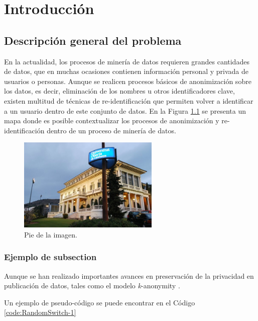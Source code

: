 \chapter{Introducción}
\label{chapter:introduccion}


\section{Descripción general del problema}

En la actualidad, los procesos de minería de datos requieren grandes cantidades de datos, que en muchas ocasiones contienen información personal y privada de usuarios o personas. Aunque se realicen procesos básicos de anonimización sobre los datos, es decir, eliminación de los nombres u otros identificadores clave, existen multitud de técnicas de re-identificación que permiten volver a identificar a un usuario dentro de este conjunto de datos. En la Figura \ref{fig:context-anoni1} se presenta un mapa donde es posible contextualizar los procesos de anonimización y re-identificación dentro de un proceso de minería de datos.

\begin{figure}
	\centering
	\includegraphics[width=0.6\textwidth]{figs/image1.png}
	\caption{Pie de la imagen.}
	\label{fig:context-anoni1}
\end{figure}

\subsection{Ejemplo de subsection}

Aunque se han realizado importantes avances en preservación de la privacidad en publicación de datos, tales como el modelo \textit{k}-anonymity \cite{Sweeney:2002}.

Un ejemplo de pseudo-código se puede encontrar en el Código \ref{code:RandomSwitch-1}

